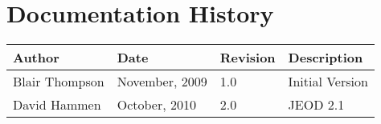 
\section{Documentation History}
\begin{tabular}{||l|l|l|l|} \hline
{\bf Author } & {\bf Date} & {\bf Revision} & {\bf Description} \\ \hline \hline
 Blair Thompson & November, 2009 & 1.0 & Initial Version \\ \hline
 David Hammen & October, 2010 & 2.0 & JEOD 2.1 \\ \hline
\end{tabular}
